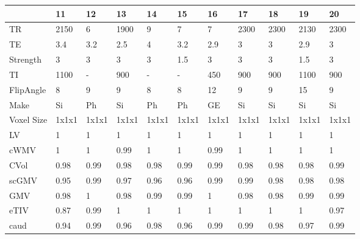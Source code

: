 \begin{table}
[]
\centering
\begin{tabular}{lllllllllll}
\toprule
{} &     11 &     12 &     13 &     14 &     15 &     16 &     17 &     18 &     19 &     20 \\
\midrule
TR                            &   2150 &      6 &   1900 &      9 &      7 &      7 &   2300 &   2300 &   2130 &   2300 \\
TE                            &    3.4 &    3.2 &    2.5 &      4 &    3.2 &    2.9 &      3 &      3 &    2.9 &      3 \\
Strength                      &      3 &      3 &      3 &      3 &    1.5 &      3 &      3 &      3 &    1.5 &      3 \\
TI                            &   1100 &      - &    900 &      - &      - &    450 &    900 &    900 &   1100 &    900 \\
FlipAngle                     &      8 &      9 &      9 &      8 &      8 &     12 &      9 &      9 &     15 &      9 \\
Make                          &     Si &     Ph &     Si &     Ph &     Ph &     GE &     Si &     Si &     Si &     Si \\
Voxel Size                    &  1x1x1 &  1x1x1 &  1x1x1 &  1x1x1 &  1x1x1 &  1x1x1 &  1x1x1 &  1x1x1 &  1x1x1 &  1x1x1 \\
\bottomrule
LV             &      1 &      1 &      1 &      1 &      1 &      1 &      1 &      1 &      1 &      1 \\
cWMV        &      1 &      1 &   0.99 &      1 &      1 &   0.99 &      1 &      1 &      1 &      1 \\
CVol                     &   0.98 &   0.99 &   0.98 &   0.98 &   0.99 &   0.99 &   0.98 &   0.98 &   0.98 &   0.99 \\
scGMV                &   0.95 &   0.99 &   0.97 &   0.96 &   0.96 &   0.99 &   0.99 &   0.98 &   0.98 &   0.98 \\
GMV                  &   0.98 &      1 &   0.98 &   0.99 &   0.99 &      1 &   0.98 &   0.98 &   0.99 &   0.99 \\
eTIV &   0.87 &   0.99 &      1 &      1 &      1 &      1 &      1 &      1 &      1 &   0.97 \\
caud                       &   0.94 &   0.99 &   0.96 &   0.98 &   0.96 &   0.99 &   0.99 &   0.98 &   0.97 &   0.99 \\

\end{tabular}
\end{table}
